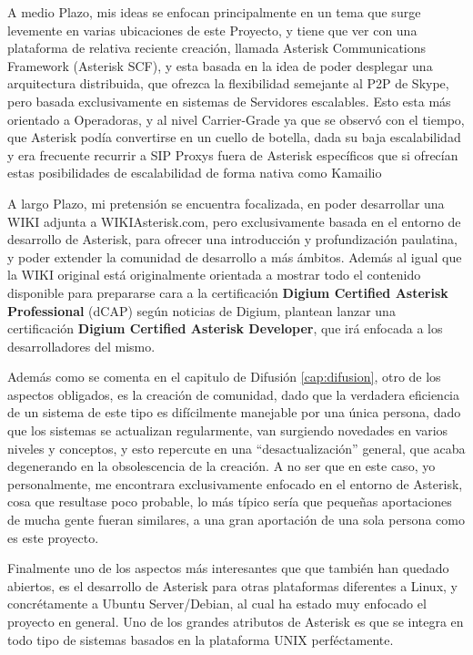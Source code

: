 A medio Plazo, mis ideas se enfocan principalmente en un tema que surge levemente en varias ubicaciones de este Proyecto, y tiene que ver con una plataforma de relativa reciente creación, llamada Asterisk Communications Framework (Asterisk SCF), y esta basada en la idea de poder desplegar una arquitectura distribuida, que ofrezca la flexibilidad semejante al P2P de Skype, pero basada exclusivamente en sistemas de Servidores escalables. Esto esta más orientado a Operadoras, y al nivel Carrier-Grade \cite{website:carriergrade} ya que se observó con el tiempo, que Asterisk podía convertirse en un cuello de botella, dada su baja escalabilidad y era frecuente recurrir a SIP Proxys \cite{goncalves10} fuera de Asterisk específicos que si ofrecían estas posibilidades de escalabilidad de forma nativa como Kamailio \cite{website:kamailio}

A largo Plazo, mi pretensión se encuentra focalizada, en poder desarrollar una WIKI adjunta a WIKIAsterisk.com, pero exclusivamente basada en el entorno de desarrollo de Asterisk, para ofrecer una introducción y profundización paulatina, y poder extender la comunidad de desarrollo a más ámbitos. Además al igual que la WIKI original está originalmente orientada a mostrar todo el contenido disponible para prepararse cara a la certificación \textbf{Digium Certified Asterisk Professional} (dCAP) según noticias de Digium, plantean lanzar una certificación \textbf{Digium Certified Asterisk Developer}, que irá enfocada a los desarrolladores del mismo.

Además como se comenta en el capitulo de Difusión \ref{cap:difusion}, otro de los aspectos obligados, es la creación de comunidad, dado que la verdadera eficiencia de un sistema de este tipo es difícilmente manejable por una única persona, dado que los sistemas se actualizan regularmente, van surgiendo novedades en varios niveles y conceptos, y esto repercute en una ``desactualización'' general, que acaba degenerando en la obsolescencia de la creación. A no ser que en este caso, yo personalmente, me encontrara exclusivamente enfocado en el entorno de Asterisk, cosa que resultase poco probable, lo más típico sería que pequeñas aportaciones de mucha gente fueran similares, a una gran aportación de una sola persona como es este proyecto.

Finalmente uno de los aspectos más interesantes que que también han quedado abiertos, es el desarrollo de Asterisk para otras plataformas diferentes a Linux, y concrétamente a Ubuntu Server/Debian, al cual ha estado muy enfocado el proyecto en general. Uno de los grandes atributos de Asterisk es que se integra en todo tipo de sistemas basados en la plataforma UNIX perféctamente.